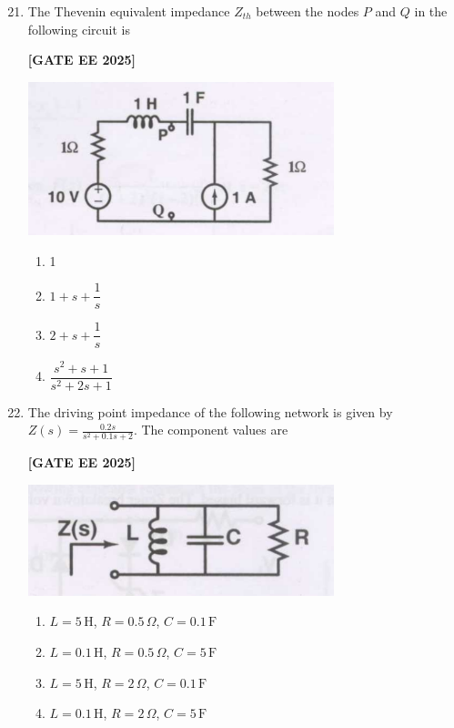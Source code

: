 \documentclass[12pt]{article}
\begin{document}
\begin{enumerate}[leftmargin=*, label=\textbf{Q.\arabic*:}]
\setcounter{enumi}{20}

\item The Thevenin equivalent impedance $Z_{th}$ between the nodes $P$ and $Q$ in the following circuit is
 
\noindent \textbf{[GATE EE 2025]}
\begin{center}
\includegraphics[width=0.7\textwidth]{figs/q21.png}
\end{center}
\begin{enumerate}[label=(\Alph*)]
  \item 1
  \item $1+s+\dfrac{1}{s}$
  \item $2+s+\dfrac{1}{s}$
  \item $\dfrac{s^2+s+1}{s^2+2s+1}$
\end{enumerate}

\item The driving point impedance of the following network is given by $Z(s)=\frac{0.2s}{s^2+0.1s+2}$. The component values are
 
\noindent \textbf{[GATE EE 2025]}
\begin{center}
\includegraphics[width=0.7\textwidth]{figs/q22.png}
\end{center}

\begin{enumerate}[label=(\Alph*)]
  \item $L=5\,\text{H}$, $R=0.5\,\Omega$, $C=0.1\,\text{F}$
  \item $L=0.1\,\text{H}$, $R=0.5\,\Omega$, $C=5\,\text{F}$
  \item $L=5\,\text{H}$, $R=2\,\Omega$, $C=0.1\,\text{F}$
  \item $L=0.1\,\text{H}$, $R=2\,\Omega$, $C=5\,\text{F}$
\end{enumerate}


\end{enumerate}
\end{document}
